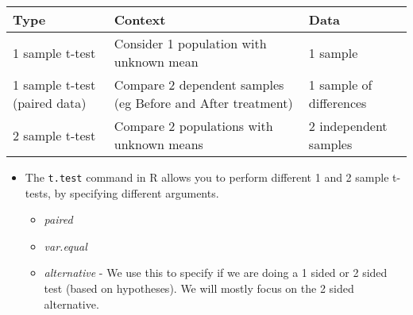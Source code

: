 \documentclass[]{article}
\providecommand{\tightlist}{%
  \setlength{\itemsep}{0pt}\setlength{\parskip}{0pt}}
\begin{document}
\begin{longtable}[]{@{}lll@{}}
\toprule
\begin{minipage}[b]{0.15\columnwidth}\raggedright
Type\strut
\end{minipage} & \begin{minipage}[b]{0.51\columnwidth}\raggedright
Context\strut
\end{minipage} & \begin{minipage}[b]{0.25\columnwidth}\raggedright
Data\strut
\end{minipage}\tabularnewline
\midrule
\endhead
\begin{minipage}[t]{0.15\columnwidth}\raggedright
1 sample t-test\strut
\end{minipage} & \begin{minipage}[t]{0.51\columnwidth}\raggedright
Consider 1 population with unknown mean\strut
\end{minipage} & \begin{minipage}[t]{0.25\columnwidth}\raggedright
1 sample\strut
\end{minipage}\tabularnewline
\begin{minipage}[t]{0.15\columnwidth}\raggedright
1 sample t-test (paired data)\strut
\end{minipage} & \begin{minipage}[t]{0.51\columnwidth}\raggedright
Compare 2 dependent samples (eg Before and After treatment)\strut
\end{minipage} & \begin{minipage}[t]{0.25\columnwidth}\raggedright
1 sample of differences\strut
\end{minipage}\tabularnewline
\begin{minipage}[t]{0.15\columnwidth}\raggedright
2 sample t-test\strut
\end{minipage} & \begin{minipage}[t]{0.51\columnwidth}\raggedright
Compare 2 populations with unknown means\strut
\end{minipage} & \begin{minipage}[t]{0.25\columnwidth}\raggedright
2 independent samples\strut
\end{minipage}\tabularnewline
\bottomrule
\end{longtable}

\begin{itemize}
\tightlist
\item
  The \texttt{t.test} command in R allows you to perform different 1 and 2 sample t-tests, by specifying different arguments.

  \begin{itemize}
  \tightlist
  \item
    \emph{paired}
  \item
    \emph{var.equal}
  \item
    \emph{alternative} - We use this to specify if we are doing a 1 sided or 2 sided test (based on hypotheses). We will mostly focus on the 2 sided alternative.
  \end{itemize}
\end{itemize}
\end{document}
